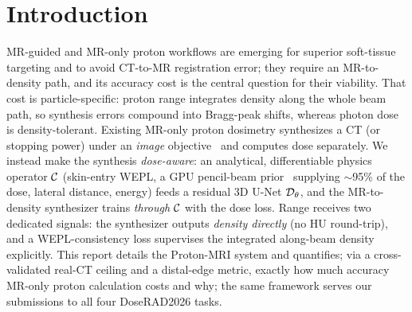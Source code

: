\documentclass{llncs}
\begin{document}
\section{Introduction}
MR-guided and MR-only proton workflows are emerging for superior soft-tissue targeting and to
avoid CT-to-MR registration error; they require an MR-to-density path, and its accuracy cost is
the central question for their viability. That cost is particle-specific: proton range
integrates density along the whole beam path, so synthesis errors compound into Bragg-peak
shifts, whereas photon dose is density-tolerant. Existing MR-only proton dosimetry synthesizes a
CT (or stopping power) under an \emph{image}
objective~\cite{mriproton,rsp,liver,ganbrain,uncert,dect} and computes dose separately. We
instead make the synthesis \emph{dose-aware}: an analytical, differentiable physics operator
$\mathcal{C}$ (skin-entry WEPL, a GPU pencil-beam prior~\cite{hong} supplying $\sim$95\% of the dose,
lateral distance, energy) feeds a residual 3D U-Net $\mathcal{D}_\theta$, and the MR-to-density
synthesizer trains \emph{through} $\mathcal{C}$ with the dose loss. Range receives two dedicated
signals: the synthesizer outputs \emph{density directly} (no HU round-trip), and a
WEPL-consistency loss supervises the integrated along-beam density explicitly. This report
details the Proton-MRI system and quantifies; via a cross-validated real-CT ceiling and a
distal-edge metric, exactly how much accuracy MR-only proton calculation costs and why; the
same framework serves our submissions to all four DoseRAD2026 tasks.
\end{document}
